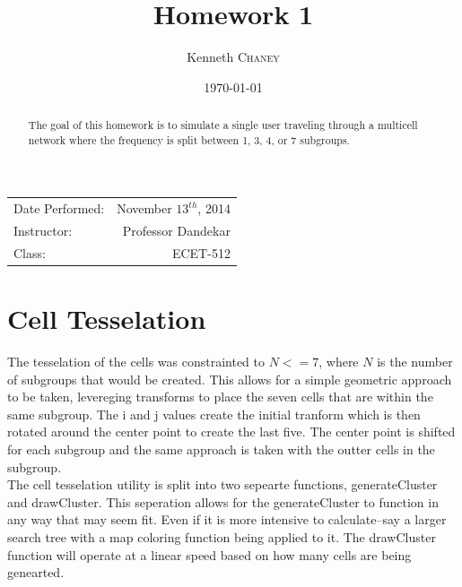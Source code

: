 \documentclass{article}
\title{Homework 1} %
\author{Kenneth \textsc{Chaney}} %
\date{\today} %
\begin{document}
\maketitle %

\begin{center}
\begin{tabular}{l r}
Date Performed: & November \(13^{th}\), 2014 \\ %
Instructor: & Professor Dandekar \\ %
Class: & ECET-512
\end{tabular}
\end{center}

\begin{abstract}
The goal of this homework is to simulate a single user traveling through a multicell network where the frequency is split between 1, 3, 4, or 7 subgroups. 

\end{abstract}

\pagebreak

\section{Cell Tesselation}\label{cells}
The tesselation of the cells was constrainted to \(N<=7\), where \(N\) is the number of subgroups that would be created. This allows for a simple geometric approach to be taken, levereging transforms to place the seven cells that are within the same subgroup. The i and j values create the initial tranform which is then rotated around the center point to create the last five. The center point is shifted for each subgroup and the same approach is taken with the outter cells in the subgroup. \\

The cell tesselation utility is split into two sepearte functions, generateCluster and drawCluster. This seperation allows for the generateCluster to function in any way that may seem fit. Even if it is more intensive to calculate--say a larger search tree with a map coloring function being applied to it. The drawCluster function will operate at a linear speed based on how many cells are being genearted. \\
\end{document}

